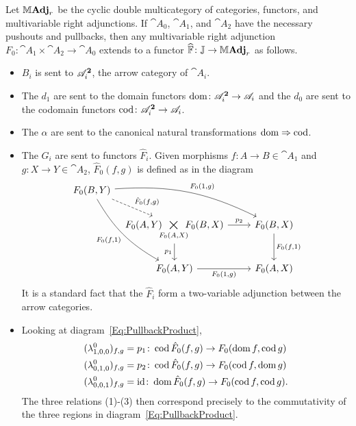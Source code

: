 \begin{example}\label{Ex:PullbackProduct}
Let $\mathbb{M}\mathbf{Adj}_r$ be the cyclic double multicategory of categories, functors, and multivariable right adjunctions. If $\cat{A}_0$, $\cat{A}_1$, and $\cat{A}_2$ have the necessary pushouts and pullbacks, then any multivariable right adjunction $F_0\colon \cat{A}_1\times \cat{A}_2\to \cat{A}_0$ extends to a functor $\widehat{\mathbb{F}}\colon\mathbb{J}\to\mathbb{M}\mathbf{Adj}_r$ as follows.
\begin{itemize}
	\item $B_i$ is sent to $\mathscr{A}_i^{\mathbf{2}}$, the arrow category of $\cat{A}_i$.
	\item The $d_1$ are sent to the domain functors $\operatorname{dom}\colon\mathscr{A}_i^{\mathbf{2}}\to\mathscr{A}_i$ and the $d_0$ are sent to the codomain functors $\operatorname{cod}\colon\mathscr{A}_i^{\mathbf{2}}\to\mathscr{A}_i$.
	\item The $\alpha$ are sent to the canonical natural transformations $\operatorname{dom}\Rightarrow\operatorname{cod}$.
	\item The $G_i$ are sent to functors $\hat{F}_i$. Given morphisms $f\colon A\to B\in\cat{A}_1$ and $g\colon X\to Y\in\cat{A}_2$, $\hat{F}_0(f,g)$ is defined as in the diagram
	\begin{equation}\label{Eq:PullbackProduct}
	\begin{tikzcd}[bend angle=15]
		F_0(B,Y) \arrow[bend left]{rrd}{F_0(1,g)}
			\arrow[bend right]{rdd}[swap]{F_0(f,1)}
			\arrow[dashed]{dr}{\hat{F}_0(f,g)}
		&[-4ex]& \\
		& F_0(A,Y)\!\!\underset{F_0(A,X)}{\bigtimes}\!\!F_0(B,X)
			\rar{p_2}
			\dar[swap]{p_1}
		& F_0(B,X) \dar{F_0(f,1)} \\
		& F_0(A,Y) \rar[swap]{F_0(1,g)} & F_0(A,X)
	\end{tikzcd}
	\end{equation}
	It is a standard fact that the $\hat{F}_i$ form a two-variable adjunction between the arrow categories. 
	\item Looking at diagram~\eqref{Eq:PullbackProduct}, 
	\begin{align*}
		(\lambda^0_{1,0,0})_{f,g}&=p_1\colon \operatorname{cod}\hat{F}_0(f,g)\to F_0(\operatorname{dom} f,\operatorname{cod} g)\\
		(\lambda^0_{0,1,0})_{f,g}&=p_2\colon \operatorname{cod}\hat{F}_0(f,g)\to F_0(\operatorname{cod} f,\operatorname{dom} g)\\
		(\lambda^0_{0,0,1})_{f,g}&=\operatorname{id}\colon \operatorname{dom}\hat{F}_0(f,g)\to F_0(\operatorname{cod} f,\operatorname{cod} g).
	\end{align*}
	The three relations (1)-(3) then correspond precisely to the commutativity of the three regions in diagram~\eqref{Eq:PullbackProduct}.
\end{itemize}
\end{example}

